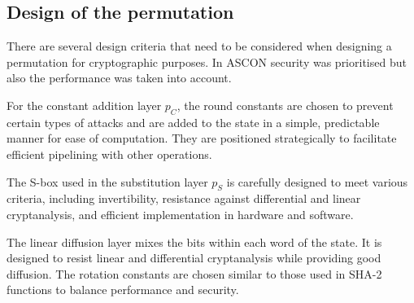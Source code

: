 \subsection{Design of the permutation}

There are several design criteria that need to be considered when designing a permutation for cryptographic purposes. In ASCON security was prioritised but also the performance was taken into account. \par

For the constant addition layer $p_C$, the round constants are chosen to prevent certain types of attacks and are added to the state in a simple, predictable manner for ease of computation. They are positioned strategically to facilitate efficient pipelining with other operations. \par

The S-box used in the substitution layer $p_S$ is carefully designed to meet various criteria, including invertibility, resistance against differential and linear cryptanalysis, and efficient implementation in hardware and software. \par

The linear diffusion layer mixes the bits within each word of the state. It is designed to resist linear and differential cryptanalysis while providing good diffusion. The rotation constants are chosen similar to those used in SHA-2 functions to balance performance and security. \cite{DBLP:journals/joc/DobraunigEMS21} \par




